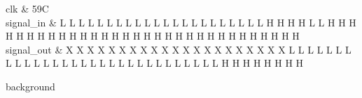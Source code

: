 \begin{tikztimingtable} [xscale=0.75]
	clk & 59{C} \\
	signal\_in & L L L L L L L L L L L L L L L L L L L L L L H H H H L L H H H H H H H H H H H H H H H H H H H H H H H H H H H H H H H \\
	signal\_out & X X X X X X X X X X X X X X X X X X X X X L L L L L L L L L L L L L L L L L L L L L L L L L L L L L L H H H H H H H H \\
	\extracode
	\begin{pgfonlayer}{background}
	\end{pgfonlayer}
\end{tikztimingtable}
